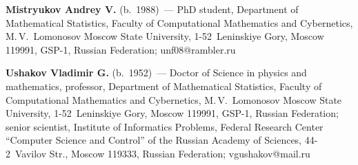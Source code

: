 \noindent
\textbf{Mistryukov Andrey V.} (b.\ 1988)~--- 
PhD student, Department of Mathematical Statistics, 
Faculty of Computational Mathematics and Cybernetics, 
M.\,V.~Lomonosov Moscow State University, 1-52~Leninskiye Gory, Moscow 119991, 
GSP-1, Russian Federation;
\mbox{unf08@rambler.ru}

\vspace*{6pt}

\noindent
\textbf{Ushakov Vladimir G.} (b.\ 1952)~--- 
Doctor of Science in physics and mathematics, professor, Department 
of Mathematical Statistics, Faculty of Computational Mathematics and 
Cybernetics, M.\,V.~Lomonosov Moscow State University, 1-52~Leninskiye Gory, 
Moscow 119991, GSP-1, Russian Federation; senior scientist, 
Institute of Informatics Problems, Federal Research Center ``Computer Science 
and Control'' of the Russian Academy of Sciences, 44-2~Vavilov Str., 
Moscow 119333, Russian Federation; \mbox{vgushakov@mail.ru}
\label{end\stat}


\renewcommand{\bibname}{\protect\rm Литература} 